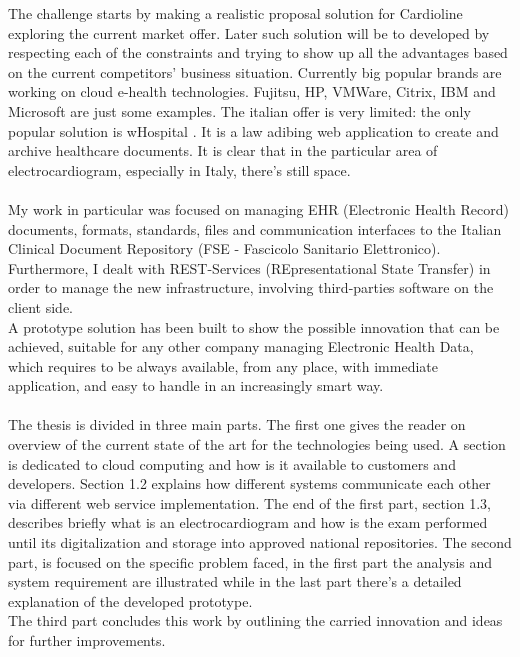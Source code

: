 The challenge starts by making a realistic proposal solution for Cardioline exploring the current market offer. Later such solution will be to developed by respecting each of the constraints and trying to show up all the advantages based on the current competitors' business situation. Currently big popular brands are working on cloud e-health technologies. Fujitsu, HP, VMWare, Citrix, IBM and Microsoft are just some examples. The italian offer is very limited: the only popular solution is wHospital \cite{whospital}. It is a law adibing web application to create and archive healthcare documents. It is clear that in the particular area of electrocardiogram, especially in Italy, there's still space.\\ \\My work in particular was focused on managing EHR (Electronic Health Record) documents, formats, standards, files and communication interfaces to the Italian Clinical Document Repository (FSE - Fascicolo Sanitario Elettronico). Furthermore, I dealt with REST-Services (REpresentational State Transfer) in order to manage the new infrastructure, involving third-parties software on the client side.\\A prototype solution has been built to show the possible innovation that can be achieved, suitable for any other company managing Electronic Health Data, which requires to be always available, from any place, with immediate application, and easy to handle in an increasingly smart way.\\ \\
The thesis is divided in three main parts. The first one gives the reader on overview of the current state of the art for the technologies being used. A section is dedicated to cloud computing and how is it available to customers and developers. Section 1.2 explains how different systems communicate each other via different web service implementation. The end of the first part, section 1.3, describes briefly what is an electrocardiogram and how is the exam performed until its digitalization and storage into approved national repositories. The second part, is focused on the specific problem faced, in the first part the analysis and system requirement are illustrated while in the last part there's a detailed explanation of the developed prototype.\\The third part concludes this work by outlining the carried innovation and ideas for further improvements.